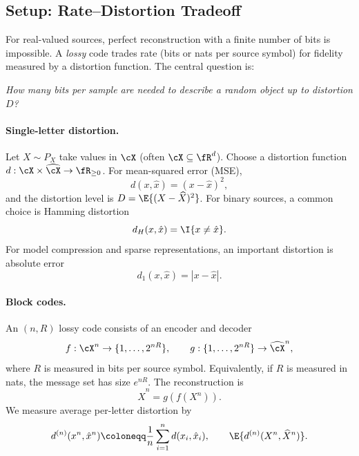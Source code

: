 \renewcommand{\Pr}{\operatorname{Pr}}


\subsection{Setup: Rate--Distortion Tradeoff}
\label{subsec:lossy-setup}

For real-valued sources, perfect reconstruction with a finite number of bits is impossible.
A \emph{lossy} code trades rate (bits or nats per source symbol) for fidelity measured by a distortion function.
The central question is:
\begin{center}
\emph{How many bits per sample are needed to describe a random object up to distortion $D$?}
\end{center}

\paragraph{Single-letter distortion.}
Let $X\sim P_X$ take values in $\cX$ (often $\cX\subseteq\fR^d$).
Choose a distortion function $d:\cX\times\widehat{\cX}\to\fR_{\ge 0}$.
For mean-squared error (MSE),
\[
    d(x,\hat x)=(x-\hat x)^2,
\]
and the distortion level is $D=\E{(X-\widehat X)^2}$.
For binary sources, a common choice is Hamming distortion
\[
    d_H(x,\hat x)=\I{x\neq \hat x}.
\]
For model compression and sparse representations, an important distortion is absolute error
\[
    d_1(x,\hat x)=|x-\hat x|.
\]

\paragraph{Block codes.}
An $(n,R)$ lossy code consists of an encoder and decoder
\[
    f:\cX^n\to \{1,\dots,2^{nR}\},
    \qquad
    g:\{1,\dots,2^{nR}\}\to \widehat{\cX}^n,
\]
where $R$ is measured in bits per source symbol.
Equivalently, if $R$ is measured in nats, the message set has size $e^{nR}$.
The reconstruction is
\[
    \widehat X^n=g(f(X^n)).
\]
We measure average per-letter distortion by
\begin{equation}
    d^{(n)}(x^n,\hat x^n)
    \coloneqq \frac{1}{n}\sum_{i=1}^n d(x_i,\hat x_i),
    \qquad
    \E{d^{(n)}(X^n,\widehat X^n)}.
\end{equation}

